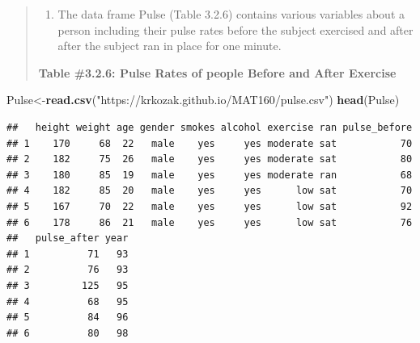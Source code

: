 \documentclass[]{book}
\newenvironment{Shaded}{\begin{snugshade}}{\end{snugshade}}
\newcommand{\KeywordTok}[1]{\textcolor[rgb]{0.13,0.29,0.53}{\textbf{#1}}}
\newcommand{\NormalTok}[1]{#1}
\newcommand{\StringTok}[1]{\textcolor[rgb]{0.31,0.60,0.02}{#1}}
\providecommand{\tightlist}{%
  \setlength{\itemsep}{0pt}\setlength{\parskip}{0pt}}
\begin{document}
\begin{quote}
\begin{enumerate}
\def\labelenumi{\arabic{enumi}.}
\setcounter{enumi}{4}
\tightlist
\item
  The data frame Pulse (Table 3.2.6) contains various variables about a person including their pulse rates before the subject exercised and after after the subject ran in place for one minute.
\end{enumerate}

\textbf{Table \#3.2.6: Pulse Rates of people Before and After Exercise}
\end{quote}

\begin{Shaded}
\begin{Highlighting}[]
\NormalTok{Pulse<-}\KeywordTok{read.csv}\NormalTok{(}\StringTok{"https://krkozak.github.io/MAT160/pulse.csv"}\NormalTok{)}
\KeywordTok{head}\NormalTok{(Pulse)}
\end{Highlighting}
\end{Shaded}

\begin{verbatim}
##   height weight age gender smokes alcohol exercise ran pulse_before
## 1    170     68  22   male    yes     yes moderate sat           70
## 2    182     75  26   male    yes     yes moderate sat           80
## 3    180     85  19   male    yes     yes moderate ran           68
## 4    182     85  20   male    yes     yes      low sat           70
## 5    167     70  22   male    yes     yes      low sat           92
## 6    178     86  21   male    yes     yes      low sat           76
##   pulse_after year
## 1          71   93
## 2          76   93
## 3         125   95
## 4          68   95
## 5          84   96
## 6          80   98
\end{verbatim}
\end{document}

